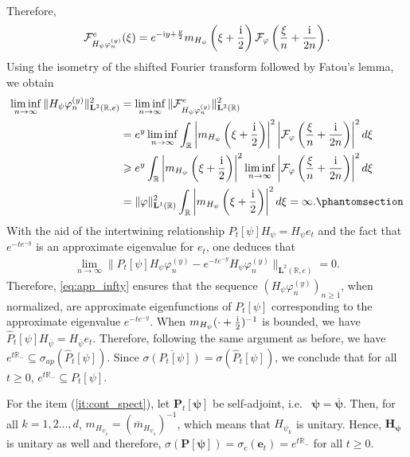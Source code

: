 \documentclass[12pt]{amsart}
\newcommand{\hlabel}{\phantomsection\label}
\numberwithin{equation}{section}
\newcommand{\bb}{\mathbb}
\newcommand{\cc}{\mathcal}
\renewcommand{\ge}{\geqslant}
\renewcommand{\geq}{\geqslant}
\newcommand{\ov}{\overline}
\newcommand{\bmrm}[2][2]{\mathbf{#2}^{#1}}
\newcommand{\fou}{\mathcal{F}}
\newcommand{\phin}{\varphi^{(y)}_n}
\newcommand{\Hpsi}{H_\psi}
\newcommand{\mpsi}{m_{\Hpsi}}
\newcommand{\fouho}{\cc{F}^{e}}
\theoremstyle{definition}
\theoremstyle{assump}
\theoremstyle{remark}
\begin{document}
{\begin{align*}
\end{align*}
Therefore,
\begin{align*}
\fouho_{\Hpsi\phin}(\xi)=e^{-\mathrm{i}y+\frac{y}{2}}\mpsi\left(\xi+\frac{{\rm{i}}}{2}\right)\fou_\varphi\left(\frac{\xi}{n}+\frac{{\rm{i}}}{2n}\right).
\end{align*}
Using the isometry of the shifted Fourier transform followed by Fatou's lemma, we obtain
\begin{align}
\liminf_{n\to\infty}\|\Hpsi\phin\|^2_{\bmrm{L}(\bb{R},e)}&=\liminf_{n\to\infty}\|\fouho_{\Hpsi\phin}\|^2_{\bmrm{L}(\bb{R})} \nonumber\\
&=e^y\liminf_{n\to\infty}\int_\bb{R}\left|\mpsi\left(\xi+\frac{{\rm{i}}}{2}\right)\right|^2\left|\fou_\varphi\left(\frac{\xi}{n}+\frac{{\rm{i}}}{2n}\right)\right|^2d\xi \nonumber\\
&\ge e^y\int_{\bb{R}}\left|\mpsi\left(\xi+\frac{{\rm{i}}}{2}\right)\right|^2\liminf_{n\to\infty}\left|\fou_\varphi\left(\frac{\xi}{n}+\frac{{\rm{i}}}{2n}\right)\right|^2d\xi \nonumber \\
&=\|\varphi\|^2_{\bmrm[1]{L}(\bb{R})}\int_{\bb{R}}\left|\mpsi\left(\xi+\frac{{\rm{i}}}{2}\right)\right|^2d\xi=\infty. \hlabel{eq:app_infty}
\end{align}
With the aid of the intertwining relationship $P_t[\psi]\Hpsi=\Hpsi e_t$ and the fact that  $e^{-te^{-y}}$ is an approximate eigenvalue for $e_t$, one deduces that
\begin{align*}
	\lim_{n\to\infty}\|P_t[\psi]\Hpsi\phin-e^{-te^{-y}}\Hpsi\phin\|_{\bmrm{L}(\bb{R},e)}=0.
\end{align*}
Therefore, \eqref{eq:app_infty} ensures that the sequence $(\Hpsi\phin)_{n\geq1}$, when normalized, are approximate eigenfunctions of $P_t[\psi]$ corresponding to the approximate eigenvalue $e^{-te^{-y}}$. When $m_{H_\psi}(\cdot+\frac{{\rm{i}}}{2})^{-1}$ is bounded, we have $\widehat{P}_t[\psi]H_{\ov{\psi}}=H_{\ov{\psi}}e_t$. Therefore, following the same argument as before, we have $e^{t\bb{R}_-}\subseteq\sigma_{ap}(\widehat{P}_t[\psi])$. Since $\overline{\sigma(P_t[\psi])}=\sigma(\widehat{P}_t[\psi])$, we conclude that for all $t\ge 0$, $e^{t\bb{R}_-}\subseteq{P_t[\psi]}$.


For the item (\ref{it:cont_spect}), let $\bm{P}_t[\bm{\psi}]$ be self-adjoint, i.e.~ $\bm{\psi}=\bm{\ov{\psi}}$. Then, for all $k=1,2\ldots, d$, $m_{H_{\psi_k}}=(\ov{m}_{H_{\psi_k}})^{-1}$, which means that $H_{\psi_k}$ is unitary. Hence, $\bm{\Hpsi}$ is unitary as well and therefore, $\sigma(\bm{P}[\bm{\psi}])=\sigma_c(\bm{e}_t)=e^{t\bb{R}_-}$ for all $t\ge 0$.

}
\end{document}
